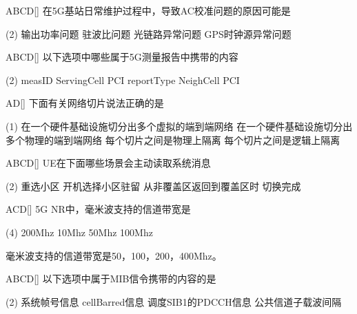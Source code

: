 \begin{choice}{\;ABCD\;}[]
    在5G基站日常维护过程中，导致AC校准问题的原因可能是
    \begin{tasks}(2)
        \task 输出功率问题
        \task 驻波比问题
        \task 光链路异常问题
        \task GPS时钟源异常问题
    \end{tasks}
\end{choice}

\begin{choice}{\;ABCD\;}[]
    以下选项中哪些属于5G测量报告中携带的内容
    \begin{tasks}(2)
        \task measID
        \task ServingCell PCI
        \task reportType
        \task NeighCell PCI
    \end{tasks}
\end{choice}


\begin{choice}{\;AD\;}[]
    下面有关网络切片说法正确的是
    \begin{tasks}(1)
        \task 在一个硬件基础设施切分出多个虚拟的端到端网络
        \task 在一个硬件基础设施切分出多个物理的端到端网络
        \task 每个切片之间是物理上隔离
        \task 每个切片之间是逻辑上隔离
    \end{tasks}
\end{choice}


\begin{choice}{\;ABCD\;}[]
    UE在下面哪些场景会主动读取系统消息
    \begin{tasks}(2)
        \task 重选小区
        \task 开机选择小区驻留
        \task 从非覆盖区返回到覆盖区时
        \task 切换完成
    \end{tasks}
\end{choice}


\begin{choice}{\;ACD\;}[]
    5G NR中，毫米波支持的信道带宽是
    \begin{tasks}(4)
        \task 200Mhz
        \task 10Mhz
        \task 50Mhz
        \task 100Mhz
    \end{tasks}
\end{choice}
\begin{solution}
毫米波支持的信道带宽是50，100，200，400Mhz。
\end{solution}

\begin{choice}{\;ABCD\;}[]
    以下选项中属于MIB信令携带的内容的是
    \begin{tasks}(2)
        \task 系统帧号信息
        \task cellBarred信息
        \task 调度SIB1的PDCCH信息
        \task 公共信道子载波间隔
    \end{tasks}
\end{choice}

